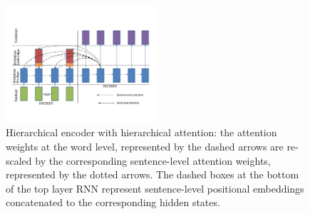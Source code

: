 \begin{figure}[ht]
    \vspace{-0.3in}
	\centering
  \includegraphics[width=0.5\textwidth]{hierarchical_attention.PDF}
  	\vspace{-0.6in}
	\caption{{\small Hierarchical encoder with hierarchical attention: the attention weights at the word level, represented by the dashed arrows are re-scaled by the corresponding sentence-level attention weights, represented by the dotted arrows. The dashed boxes at the bottom of the top layer RNN represent sentence-level positional embeddings concatenated to the corresponding hidden states.}}
	\label{fig:hierarchical_attention}
\end{figure}




